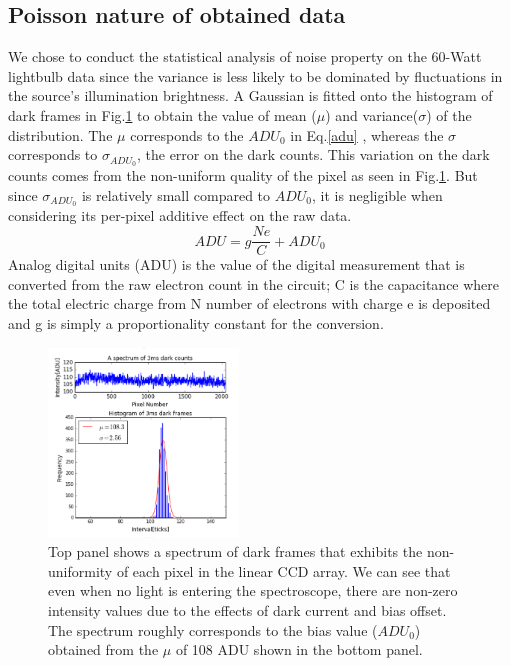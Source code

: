 \documentclass[authoryear,12pt,5p,times]{elsarticle}
\begin{document}
 \subsection{Poisson nature of obtained data}
 We chose to conduct the statistical analysis of noise property on the 60-Watt lightbulb data since the variance is less likely to be dominated by fluctuations in the source's illumination brightness.
 A Gaussian is fitted onto the histogram of dark frames in Fig.\ref{dark&histo} to obtain the value of mean ($\mu$) and variance($\sigma$) of the distribution. The $\mu$ corresponds to the $ADU_0$ in Eq.\ref{adu} , whereas the $\sigma$ corresponds to $\sigma_{ADU_0}$, the error on the dark counts. This variation on the dark counts comes from the non-uniform quality of the pixel as seen in Fig.\ref{dark&histo}. But since $\sigma_{ADU_0}$ is relatively small compared to $ADU_0$, it is negligible when considering its per-pixel additive effect on the raw data.
 \begin{equation}\label{adu}
 ADU = g \frac{Ne}{C}+ADU_0
 \end{equation}
Analog digital units (ADU) is the value of the digital measurement that is converted from the raw electron count in the circuit; C is the capacitance where the total electric charge from N number of electrons with charge e is deposited and g is simply a proportionality constant for the conversion.
 \begin{figure}
 \includegraphics[width=0.45\textwidth]{figures/dark&biashisto}\caption{Top panel shows a spectrum of dark frames that exhibits the non-uniformity of each pixel in the linear CCD array. We can see that even when no light is entering the spectroscope, there are non-zero intensity values due to the effects of dark current and bias offset. The spectrum roughly corresponds to the bias value ($ADU_0$) obtained from the $\mu$ of 108 ADU shown in the bottom panel.}\label{dark&histo}\end{figure}
 
\end{document}
